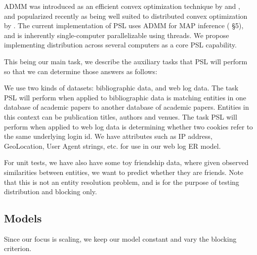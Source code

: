 \documentclass{article}
\begin{document}
ADMM was introduced as an efficient convex optimization technique by \cite{glowinski1975approximation} and \cite{gabay1976dual}, and popularized recently as being well suited to distributed convex optimization by \cite{boyd2011distributed}. The current implementation of PSL uses ADMM for MAP inference (\cite{bach2015hinge} \S 5), and is inherently single-computer parallelizable using threads. We propose implementing distribution across several computers as a core PSL capability.

This being our main task, we describe the auxiliary tasks that PSL will perform so that we can determine those answers as follows:

We use two kinds of datasets: bibliographic data, and web log data. The task PSL will perform when applied to bibliographic data is matching entities in one database of academic papers to another database of academic papers. Entities in this context can be publication titles, authors and venues. The task PSL will perform when applied to web log data is determining whether two cookies refer to the same underlying login id. We have attributes such as IP address, GeoLocation, User Agent strings, etc. for use in our web log ER model.

For unit tests, we have also have some toy friendship data, where given observed similarities between entities, we want to predict whether they are friends. Note that this is not an entity resolution problem, and is for the purpose of testing distribution and blocking only.


\subsection{Models} \label{models}

Since our focus is scaling, we keep our model constant and vary the blocking criterion.
\end{document}
